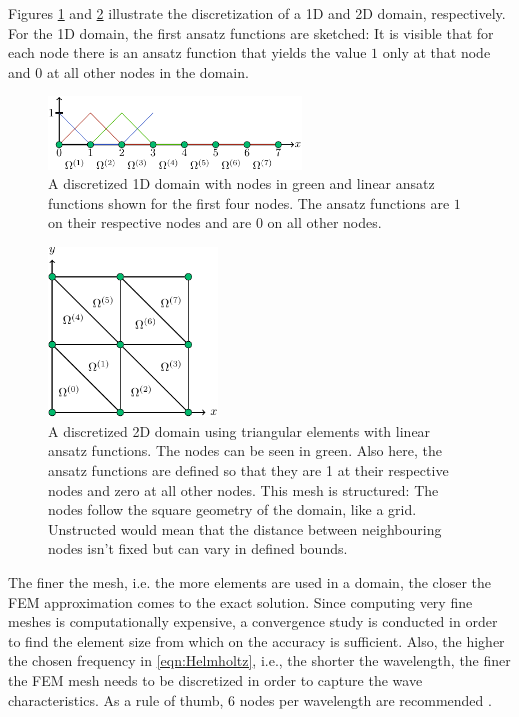 \documentclass[%
  a4paper,oneside,%
  11pt,%
  smallchapters,
  style=printdev,
  extramargin,
  green,%
  rgb, <cmyk>
  ]{tubsbook}
\begin{document}
Figures \ref{fig:1DDom} and \ref{fig:2DDom} illustrate the discretization of a 1D and 2D domain, respectively.  For the 1D domain, the first ansatz functions are sketched: It is visible that for each node there is an ansatz function that yields the value $1$ only at that node and $0$ at all other nodes in the domain.
%
\begin{figure}[!ht]
\begin{center}

\includegraphics[width=0.6\textwidth]{pics/1dDomainNew}
\caption[FEM mesh of the 1D example]{A discretized 1D domain with nodes in green and linear ansatz functions shown for the first four nodes. The ansatz functions are $1$ on their respective nodes and are $0$ on all other nodes.}
\label{fig:1DDom}

\end{center}
\end{figure}
%
\begin{figure}[!ht]
\begin{center}

\includegraphics[width=0.4\textwidth]{pics/2dDomain}
\caption[FEM mesh for a 2D example]{A discretized 2D domain using triangular elements with linear ansatz functions. The nodes can be seen in green. Also here, the ansatz functions are defined so that they are 1 at their respective nodes and zero at all other nodes. This mesh is structured: The nodes follow the square geometry of the domain, like a grid. Unstructed would mean that the distance between neighbouring nodes isn't fixed but can vary in defined bounds.}
\label{fig:2DDom}

\end{center}
\end{figure}
%
The finer the mesh, i.e. the more elements are used in a domain, the closer the FEM approximation comes to the exact solution. Since computing very fine meshes is computationally expensive, a convergence study is conducted in order to find the element size from which on the accuracy is sufficient. Also, the higher the chosen frequency in \eqref{eqn:Helmholtz}, i.e., the shorter the wavelength, the finer the FEM mesh needs to be discretized in order to capture the wave characteristics. As a rule of thumb, $6$ nodes per wavelength are recommended \cite{Marburga}.
\end{document}
